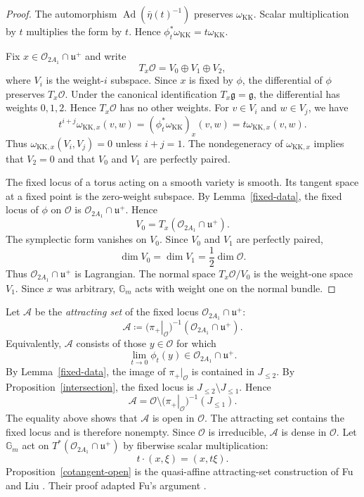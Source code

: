 \documentclass[12pt]{article}
\theoremstyle{definition}
\DeclareMathOperator{\Ad}{Ad}
\begin{document}
\begin{proof}
The automorphism \(\Ad(\bar\eta(t)^{-1})\) preserves
\(\omega_{\mathrm{KK}}\). Scalar multiplication by \(t\) multiplies the
form by \(t\). Hence
\(\phi_t^*\omega_{\mathrm{KK}}=t\omega_{\mathrm{KK}}\).

Fix \(x\in\mathcal O_{2A_1}\cap\mathfrak u^+\) and write
\[
    T_x\mathcal O=V_0\oplus V_1\oplus V_2,
\]
where \(V_i\) is the weight-\(i\) subspace. Since \(x\) is fixed by
\(\phi\), the differential of \(\phi\) preserves \(T_x\mathcal O\). Under the
canonical identification \(T_x\mathfrak g=\mathfrak g\), the differential
has weights \(0,1,2\). Hence \(T_x\mathcal O\) has no other weights. For
\(v\in V_i\) and \(w\in V_j\), we have
\[
    t^{i+j}\omega_{\mathrm{KK},x}(v,w)
    = (\phi_t^*\omega_{\mathrm{KK}})_x(v,w)
    = t\omega_{\mathrm{KK},x}(v,w).
\]
Thus \(\omega_{\mathrm{KK},x}(V_i,V_j)=0\) unless \(i+j=1\).
The nondegeneracy of \(\omega_{\mathrm{KK},x}\) implies that \(V_2=0\)
and that \(V_0\) and \(V_1\) are perfectly paired.

The fixed locus of a torus acting on a smooth variety is smooth. Its tangent
space at a fixed point is the zero-weight subspace. By
Lemma~\ref{fixed-data}, the fixed locus of \(\phi\) on \(\mathcal O\) is
\(\mathcal O_{2A_1}\cap\mathfrak u^+\). Hence
\[
    V_0=T_x(\mathcal O_{2A_1}\cap\mathfrak u^+).
\]
The symplectic form vanishes on \(V_0\). Since \(V_0\) and \(V_1\) are
perfectly paired,
\[
    \dim V_0=\dim V_1=\frac12\dim\mathcal O.
\]
Thus \(\mathcal O_{2A_1}\cap\mathfrak u^+\) is Lagrangian. The normal space
\(T_x\mathcal O/V_0\) is the weight-one space \(V_1\). Since \(x\) was arbitrary,
\(\mathbb G_m\) acts with weight one on the normal bundle.
\end{proof}

Let \(\mathcal A\) be the \emph{attracting set} of the fixed locus
\(\mathcal O_{2A_1}\cap\mathfrak u^+\):
\[
    \mathcal A
    \coloneqq
    \bigl(\left.\pi_+\right|_{\mathcal O}\bigr)^{-1}
    (\mathcal O_{2A_1}\cap\mathfrak u^+).
\]
Equivalently, \(\mathcal A\) consists of those \(y\in\mathcal O\) for which
\[
    \lim_{t\to0}\phi_t(y)\in\mathcal O_{2A_1}\cap\mathfrak u^+.
\]
By Lemma~\ref{fixed-data}, the image of \(\pi_+|_{\mathcal O}\) is contained in
\(J_{\leq2}\). By Proposition~\ref{intersection}, the fixed locus is
\(J_{\leq2}\setminus J_{\leq1}\). Hence
\[
    \mathcal A
    =
    \mathcal O\setminus
    \bigl(\left.\pi_+\right|_{\mathcal O}\bigr)^{-1}(J_{\leq1}).
\]
The equality above shows that \(\mathcal A\) is open in \(\mathcal O\). The attracting
set contains the fixed locus and is therefore nonempty. Since \(\mathcal O\) is
irreducible, \(\mathcal A\) is dense in \(\mathcal O\).
Let \(\mathbb G_m\) act on \(T^*(\mathcal O_{2A_1}\cap\mathfrak u^+)\) by fiberwise
scalar multiplication:
\[
    t\cdot(x,\xi)=(x,t\xi).
\]
Proposition~\ref{cotangent-open} is the quasi-affine attracting-set
construction of Fu and Liu \cite[Proof of Theorem~4.2]{FuLiu}. Their proof
adapted Fu's argument \cite[Proof of Lemma~3.7]{FuSymplectic}.
\end{document}

